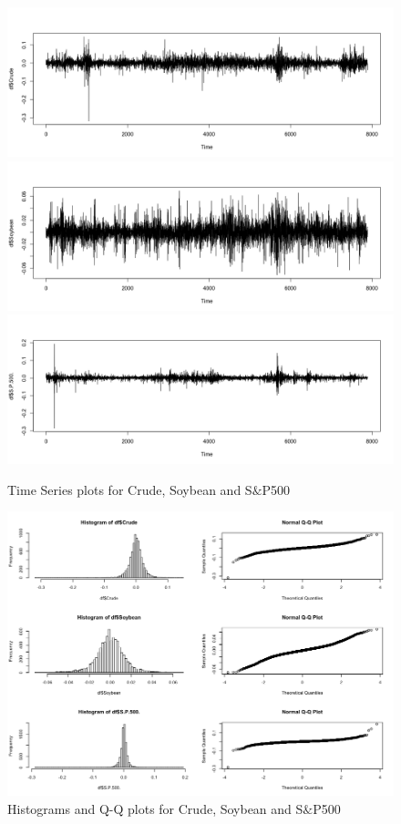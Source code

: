 \documentclass[11pt,]{article}
\begin{document}
\begin{figure}
\centering
\includegraphics[width=1.0\textwidth]{ts_crude.png}
\includegraphics[width=1.0\textwidth]{ts_soybean.png}
\includegraphics[width=1.0\textwidth]{ts_sp500.png}
\caption{\label{ts} Time Series plots for Crude, Soybean and S$\&$P500}
\end{figure}

\begin{figure}
\includegraphics[width=1.0\textwidth]{histqq.png}
\caption{\label{histqq} Histograms and Q-Q plots for Crude, Soybean and S$\&$P500}
\end{figure}
\end{document}
